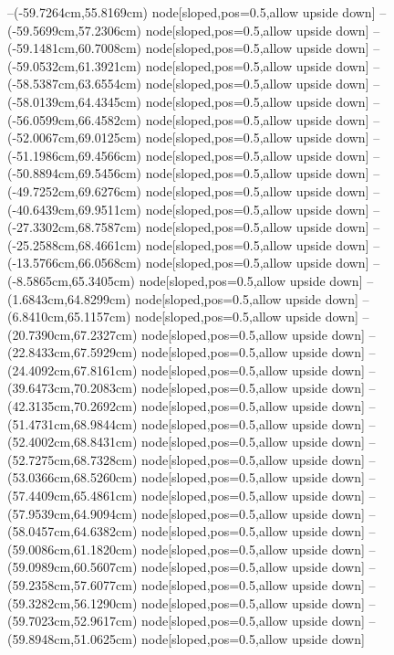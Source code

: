 --(-59.7264cm,55.8169cm) node[sloped,pos=0.5,allow upside down]{\ArrowIn}
--(-59.5699cm,57.2306cm) node[sloped,pos=0.5,allow upside down]{\ArrowIn}
--(-59.1481cm,60.7008cm) node[sloped,pos=0.5,allow upside down]{\ArrowIn}
--(-59.0532cm,61.3921cm) node[sloped,pos=0.5,allow upside down]{\arrowIn}
--(-58.5387cm,63.6554cm) node[sloped,pos=0.5,allow upside down]{\ArrowIn}
--(-58.0139cm,64.4345cm) node[sloped,pos=0.5,allow upside down]{\arrowIn}
--(-56.0599cm,66.4582cm) node[sloped,pos=0.5,allow upside down]{\ArrowIn}
--(-52.0067cm,69.0125cm) node[sloped,pos=0.5,allow upside down]{\ArrowIn}
--(-51.1986cm,69.4566cm) node[sloped,pos=0.5,allow upside down]{\arrowIn}
--(-50.8894cm,69.5456cm) node[sloped,pos=0.5,allow upside down]{\arrowIn}
--(-49.7252cm,69.6276cm) node[sloped,pos=0.5,allow upside down]{\ArrowIn}
--(-40.6439cm,69.9511cm) node[sloped,pos=0.5,allow upside down]{\ArrowIn}
--(-27.3302cm,68.7587cm) node[sloped,pos=0.5,allow upside down]{\ArrowIn}
--(-25.2588cm,68.4661cm) node[sloped,pos=0.5,allow upside down]{\ArrowIn}
--(-13.5766cm,66.0568cm) node[sloped,pos=0.5,allow upside down]{\ArrowIn}
--(-8.5865cm,65.3405cm) node[sloped,pos=0.5,allow upside down]{\ArrowIn}
--(1.6843cm,64.8299cm) node[sloped,pos=0.5,allow upside down]{\ArrowIn}
--(6.8410cm,65.1157cm) node[sloped,pos=0.5,allow upside down]{\ArrowIn}
--(20.7390cm,67.2327cm) node[sloped,pos=0.5,allow upside down]{\ArrowIn}
--(22.8433cm,67.5929cm) node[sloped,pos=0.5,allow upside down]{\ArrowIn}
--(24.4092cm,67.8161cm) node[sloped,pos=0.5,allow upside down]{\ArrowIn}
--(39.6473cm,70.2083cm) node[sloped,pos=0.5,allow upside down]{\ArrowIn}
--(42.3135cm,70.2692cm) node[sloped,pos=0.5,allow upside down]{\ArrowIn}
--(51.4731cm,68.9844cm) node[sloped,pos=0.5,allow upside down]{\ArrowIn}
--(52.4002cm,68.8431cm) node[sloped,pos=0.5,allow upside down]{\arrowIn}
--(52.7275cm,68.7328cm) node[sloped,pos=0.5,allow upside down]{\arrowIn}
--(53.0366cm,68.5260cm) node[sloped,pos=0.5,allow upside down]{\arrowIn}
--(57.4409cm,65.4861cm) node[sloped,pos=0.5,allow upside down]{\ArrowIn}
--(57.9539cm,64.9094cm) node[sloped,pos=0.5,allow upside down]{\arrowIn}
--(58.0457cm,64.6382cm) node[sloped,pos=0.5,allow upside down]{\arrowIn}
--(59.0086cm,61.1820cm) node[sloped,pos=0.5,allow upside down]{\ArrowIn}
--(59.0989cm,60.5607cm) node[sloped,pos=0.5,allow upside down]{\arrowIn}
--(59.2358cm,57.6077cm) node[sloped,pos=0.5,allow upside down]{\ArrowIn}
--(59.3282cm,56.1290cm) node[sloped,pos=0.5,allow upside down]{\ArrowIn}
--(59.7023cm,52.9617cm) node[sloped,pos=0.5,allow upside down]{\ArrowIn}
--(59.8948cm,51.0625cm) node[sloped,pos=0.5,allow upside down]{\ArrowIn}
